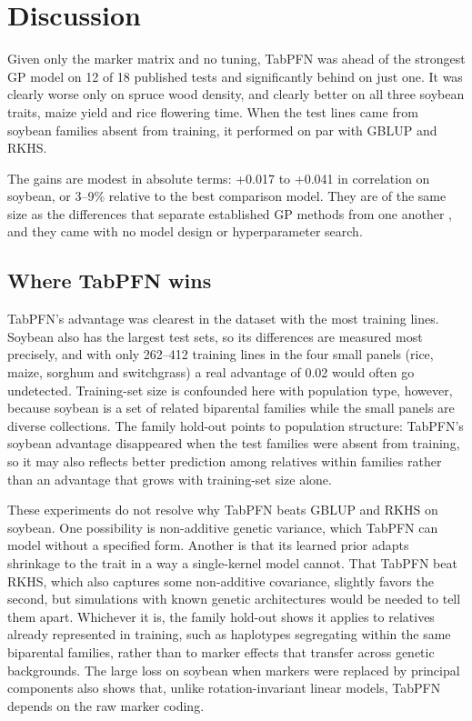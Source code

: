 \documentclass[11pt]{article}
\begin{document}
\section{Discussion}

Given only the marker matrix and no tuning, TabPFN was ahead of the strongest GP model on 12 of 18 published tests and significantly behind on just one. It was clearly worse only on spruce wood density, and clearly better on all three soybean traits, maize yield and rice flowering time. When the test lines came from soybean families absent from training, it performed on par with GBLUP and RKHS.

The gains are modest in absolute terms: +0.017 to +0.041 in correlation on soybean, or 3--9\% relative to the best comparison model. They are of the same size as the differences that separate established GP methods from one another \citep{azodi2019,quesadatraver2025}, and they came with no model design or hyperparameter search.

\subsection{Where TabPFN wins}

TabPFN's advantage was clearest in the dataset with the most training lines. Soybean also has the largest test sets, so its differences are measured most precisely, and with only 262--412 training lines in the four small panels (rice, maize, sorghum and switchgrass) a real advantage of 0.02 would often go undetected. Training-set size is confounded here with population type, however, because soybean is a set of related biparental families while the small panels are diverse collections. The family hold-out points to population structure: TabPFN's soybean advantage disappeared when the test families were absent from training, so it may also reflects better prediction among relatives within families rather than an advantage that grows with training-set size alone.

These experiments do not resolve why TabPFN beats GBLUP and RKHS on soybean. One possibility is non-additive genetic variance, which TabPFN can model without a specified form. Another is that its learned prior adapts shrinkage to the trait in a way a single-kernel model cannot. That TabPFN beat RKHS, which also captures some non-additive covariance, slightly favors the second, but simulations with known genetic architectures would be needed to tell them apart. Whichever it is, the family hold-out shows it applies to relatives already represented in training, such as haplotypes segregating within the same biparental families, rather than to marker effects that transfer across genetic backgrounds. The large loss on soybean when markers were replaced by principal components also shows that, unlike rotation-invariant linear models, TabPFN depends on the raw marker coding.
\end{document}
